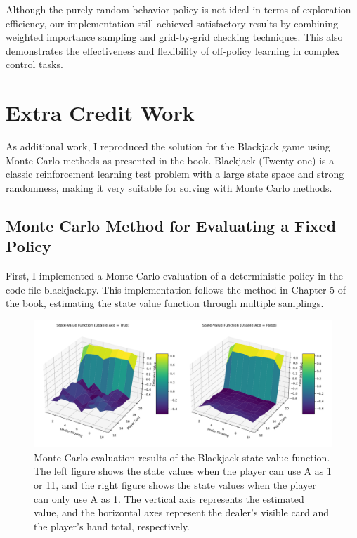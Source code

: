 \documentclass{article}
\begin{document}
Although the purely random behavior policy is not ideal in terms of exploration efficiency, our implementation still achieved satisfactory results by combining weighted importance sampling and grid-by-grid checking techniques. This also demonstrates the effectiveness and flexibility of off-policy learning in complex control tasks.



\section{Extra Credit Work}

As additional work, I reproduced the solution for the Blackjack game using Monte Carlo methods as presented in the book. Blackjack (Twenty-one) is a classic reinforcement learning test problem with a large state space and strong randomness, making it very suitable for solving with Monte Carlo methods.

\subsection{Monte Carlo Method for Evaluating a Fixed Policy}

First, I implemented a Monte Carlo evaluation of a deterministic policy in the code file blackjack.py. This implementation follows the method in Chapter 5 of the book, estimating the state value function through multiple samplings.

\begin{figure}[h]
    \centering
    \includegraphics[width=\textwidth]{blackjack.png}
    \caption{Monte Carlo evaluation results of the Blackjack state value function. The left figure shows the state values when the player can use A as 1 or 11, and the right figure shows the state values when the player can only use A as 1. The vertical axis represents the estimated value, and the horizontal axes represent the dealer's visible card and the player's hand total, respectively.}
    \label{fig:blackjack-value}
\end{figure}
\end{document}
